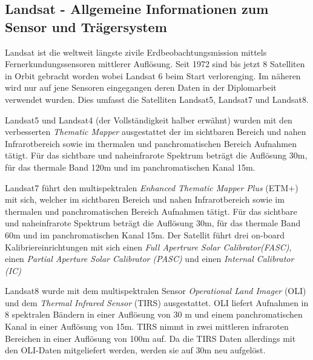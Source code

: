 \documentclass[11pt]{report}
\begin{document}


\subsection{Landsat - Allgemeine Informationen zum Sensor und Trägersystem}
Landsat ist die weltweit längste zivile Erdbeobachtungsmission mittels Fernerkundungssensoren  mittlerer Auflösung. Seit 1972 sind bis jetzt 8 Satelliten in Orbit gebracht worden wobei Landsat 6 beim Start verlorenging. Im näheren wird nur auf jene Sensoren eingegangen deren Daten in der Diplomarbeit verwendet wurden. Dies umfasst die Satelliten Landsat5, Landsat7 und Landsat8.

Landsat5 und Landsat4 (der Vollständigkeit halber erwähnt) wurden mit den verbesserten \textit{Thematic Mapper} ausgestattet der im sichtbaren Bereich und nahen Infrarotbereich sowie im thermalen und panchromatischen Bereich Aufnahmen tätigt. Für das sichtbare und naheinfrarote Spektrum beträgt die Auflösung 30m, für das thermale Band 120m und im panchromatischen Kanal 15m.

Landsat7 führt den multispektralen \textit{Enhanced Thematic Mapper Plus} (ETM+) mit sich, welcher im sichtbaren Bereich und nahen Infrarotbereich sowie im thermalen und panchromatischen Bereich Aufnahmen tätigt. Für das sichtbare und naheinfrarote Spektrum beträgt die Auflösung 30m, für das thermale Band 60m und im panchromatischen Kanal 15m.
Der Satellit führt drei on-board Kalibriereinrichtungen mit sich einen \textit{Full Apertrure Solar Calibrator(FASC)}, einen \textit{Partial Aperture Solar Calibrator (PASC)} und einen \textit{Internal Calibrator (IC)}

Landsat8 wurde mit dem multispektralen Sensor \textit{Operational Land Imager} (OLI) und dem \textit{Thermal Infrared Sensor} (TIRS) ausgestattet. OLI liefert Aufnahmen in 8 spektralen Bändern in einer Auflösung von 30 m und einem panchromatischen Kanal in einer Auflösung von 15m. TIRS nimmt in zwei mittleren infraroten Bereichen in einer Auflösung von 100m auf. Da die TIRS Daten allerdings mit den OLI-Daten mitgeliefert werden, werden sie auf 30m neu aufgelöst.
\end{document}

